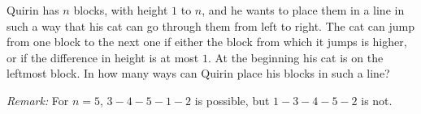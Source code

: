 Quirin has $n$ blocks, with height $1$ to $n$, and he wants to place them in a line in such a way that his cat can go through them from left to right. The cat can jump from one block to the next one if either the block from which it jumps is higher, or if the difference in height is at most $1$. At the beginning his cat is on the leftmost block. In how many ways can Quirin place his blocks in such a line?

\emph{Remark:} For $n=5$, $3-4-5-1-2$ is possible, but $1-3-4-5-2$ is not.

